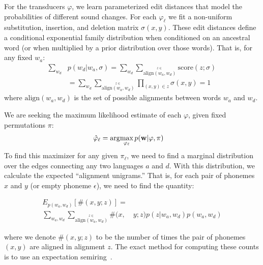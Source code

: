 \documentclass[11pt,a4paper]{article}
\begin{document}
For the transducers $\varphi$, we learn parameterized edit distances
that model the probabilities of different sound changes. For each
$\varphi_\ell$ we fit a non-uniform substitution, insertion, and
deletion matrix $\sigma(x,y)$. These edit distances define a
conditional exponential family distribution when conditioned on an
ancestral word (or when multiplied by a prior distribution over
those words). That is, for any fixed $w_a$: \begin{equation*}
  \begin{split}
    \sum_{w_d} &p(w_d|w_a,\sigma) = \sum_{w_d}
    \sum_{\stackrel{z\in}{\scriptscriptstyle\mathrm{align}(w_a,w_d)}}
    \mathrm{score}(z;\sigma) \\ &= \sum_{w_d}
    \sum_{\stackrel{z\in}{\scriptscriptstyle\mathrm{align}(w_a,w_d)}}
    \prod_{(x,y)\in z} \sigma(x,y) = 1
   \end{split}
 \end{equation*}
where $\mathrm{align}(w_a,w_d)$ is the set of possible alignments between words $w_a$ and $w_d$.

We are seeking the maximum likelihood estimate of each $\varphi$, given
fixed permutations $\pi$:
\begin{equation*}
  \begin{split}
    \hat\varphi_{\ell} &= \arg\negthinspace\max_{\varphi_{\ell}} p(\mathbf w|\mathbf \varphi,\mathbf\pi)
   \end{split}
 \end{equation*}
To find this maximizer for any given $\pi_\ell$, we need to find a marginal
distribution over the edges connecting any two languages $a$ and
$d$. With this distribution, we calculate the expected ``alignment
unigrams.'' That is,  for each pair of phonemes $x$ and $y$ (or
empty phoneme $\epsilon$), we need to find the quantity:
\resizebox{3in}{!} {
\begin{minipage}[b]{0.5\textwidth}
  \begin{equation*}
    \begin{split}
    E_{p(w_a,w_d)}[\#(x,y;z)] = \\
    \sum_{ w_a,w_d} \sum_{\stackrel{z\in}{\scriptscriptstyle\mathrm{align}(w_a,w_d)}} \#(x,&y;z) p(z|w_a,w_d)p(w_a,w_d)
  \end{split}
  \end{equation*}
\end{minipage}
\phantom{\tiny test}
}
where we denote $\#(x,y;z)$ to be the number of times the pair of
phonemes $(x,y)$ are aligned in alignment $z$.  The exact method
for computing these counts is to use an expectation
semiring~\cite{eisner2001expectation}.
\end{document}
